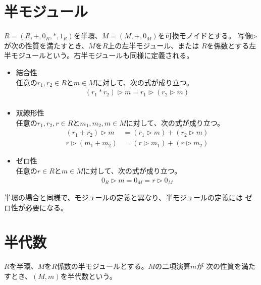 \section{半モジュール}\label{s1:半モジュール} %
	\begin{definition}[半モジュール]\label{def:半モジュール} %
		$R=(R,+,0_R,*,1_R)$を半環、$M=(M,+,0_M)$を可換モノイドとする。
		写像$\rhd$が次の性質を満たすとき、$M$を$R$上の左半モジュール、または
		$R$を係数とする左半モジュールという。右半モジュールも同様に定義される。
		\begin{itemize}
			\item 結合性 \\
			任意の$r_1,r_2\in R$と$m\in M$に対して、次の式が成り立つ。
			\begin{equation}\begin{split} %
				(r_1*r_2)\rhd m = r_1\rhd (r_2\rhd m) \\
			\end{split}\end{equation} %
			\item 双線形性 \\
			任意の$r_1,r_2,r\in R$と$m_1,m_2,m\in M$に対して、次の式が成り立つ。
			\begin{equation}\begin{split} %
				(r_1+r_2)\rhd m &= (r_1\rhd m)+(r_2\rhd m) \\
				r\rhd (m_1+m_2) &= (r\rhd m_1)+(r\rhd m_2)
			\end{split}\end{equation} %
			\item ゼロ性 \\
			任意の$r\in R$と$m\in M$に対して、次の式が成り立つ。
			\begin{equation}\begin{split} %
				0_R\rhd m = 0_M = r\rhd 0_M
			\end{split}\end{equation} %
		\end{itemize}
	\end{definition} %

	半環の場合と同様で、モジュールの定義と異なり、半モジュールの定義には
	ゼロ性が必要になる。

\section{半代数}\label{s1:半代数} %
	\begin{definition}[半代数]\label{def:半代数} %
		$R$を半環、$M$を$R$係数の半モジュールとする。$M$の二項演算$m$が
		次の性質を満たすとき、$(M,m)$を半代数という。
	\end{definition} %
